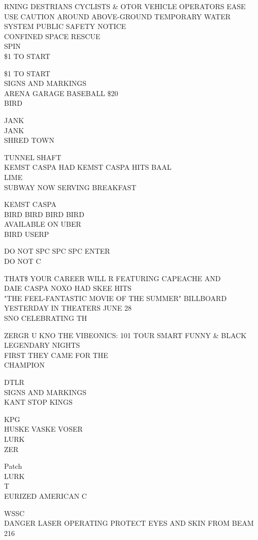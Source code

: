 \documentclass[10pt,letterpaper]{article}
\begin{document}
RNING DESTRIANS CYCLISTS \& OTOR VEHICLE OPERATORS EASE USE CAUTION AROUND ABOVE{-}GROUND TEMPORARY WATER SYSTEM PUBLIC SAFETY NOTICE\\
CONFINED SPACE RESCUE\\
SPIN\\
\$1 TO START

\$1 TO START\\
SIGNS AND MARKINGS\\
ARENA GARAGE BASEBALL \$20\\
BIRD

JANK\\
JANK\\
SHRED TOWN

TUNNEL SHAFT\\
KEMST CASPA HAD KEMST CASPA HITS BAAL\\
LIME\\
SUBWAY NOW SERVING BREAKFAST

KEMST CASPA\\
BIRD BIRD BIRD BIRD\\
AVAILABLE ON UBER\\
BIRD USERP

DO NOT SPC SPC SPC ENTER\\
DO NOT C

THAT\$ YOUR CAREER WILL R FEATURING CAPEACHE AND\\
DAIE CASPA NOXO HAD SKEE HITS\\
"THE FEEL{-}FANTASTIC MOVIE OF THE SUMMER" BILLBOARD YESTERDAY IN THEATERS JUNE 28\\
SNO CELEBRATING TH

ZERGR U KNO THE VIBEONICS: 101 TOUR SMART FUNNY \& BLACK\\
LEGENDARY NIGHTS\\
FIRST THEY CAME FOR THE\\
CHAMPION

DTLR\\
SIGNS AND MARKINGS\\
KANT STOP KINGS

KPG\\
HUSKE VASKE VOSER\\
LURK\\
ZER

Patch\\
LURK\\
T\\
EURIZED AMERICAN C

WSSC\\
DANGER LASER OPERATING PROTECT EYES AND SKIN FROM BEAM\\
216
\end{document}

